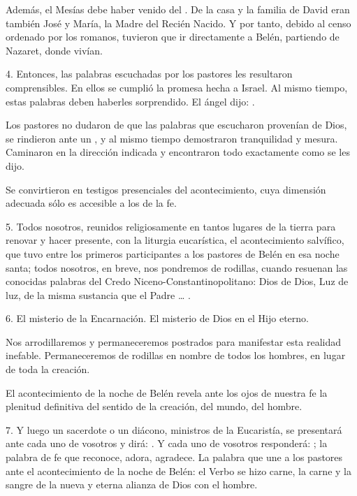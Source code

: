 \begin{body}
	Además, el Mesías debe haber venido del . De la casa y la familia de David eran también José y María, la Madre del Recién Nacido. Y por tanto, debido al censo ordenado por los romanos, tuvieron que ir directamente a Belén, partiendo de Nazaret, donde vivían.
	
	4. Entonces, las palabras escuchadas por los pastores les resultaron comprensibles. En ellos se cumplió la promesa hecha a Israel. Al mismo tiempo, estas palabras deben haberles sorprendido. El ángel dijo: .
	
	Los pastores no dudaron de que las palabras que escucharon provenían de Dios, se rindieron ante un , y al mismo tiempo demostraron tranquilidad y mesura. Caminaron en la dirección indicada y encontraron todo exactamente como se les dijo.
	
	Se convirtieron en testigos presenciales del acontecimiento, cuya dimensión adecuada sólo es accesible a los  de la fe.
	
	5. Todos nosotros, reunidos religiosamente en tantos lugares de la tierra para renovar y hacer presente, con la liturgia eucarística, el acontecimiento salvífico, que tuvo entre los primeros participantes a los pastores de Belén en esa noche santa; todos nosotros, en breve, nos pondremos de rodillas, cuando resuenan las conocidas palabras del Credo Niceno-Constantinopolitano: Dios de Dios, Luz de luz, de la misma sustancia que el Padre \ldots{} .
	
	6. El misterio de la Encarnación. El misterio de Dios  en el Hijo eterno.
	
	Nos arrodillaremos y permaneceremos postrados para manifestar esta realidad inefable. Permaneceremos de rodillas en nombre de todos los hombres, en lugar de toda la creación.
	
	El acontecimiento de la noche de Belén revela ante los ojos de nuestra fe la plenitud definitiva del sentido de la creación, del mundo, del hombre.
	
	7. Y luego un sacerdote o un diácono, ministros de la Eucaristía, se presentará ante cada uno de vosotros y dirá: . Y cada uno de vosotros responderá: ; la palabra de fe que reconoce, adora, agradece. La palabra que une a los pastores ante el acontecimiento de la noche de Belén: el Verbo se hizo carne, la carne y la sangre de la nueva y eterna alianza de Dios con el hombre.
	

\end{body}
